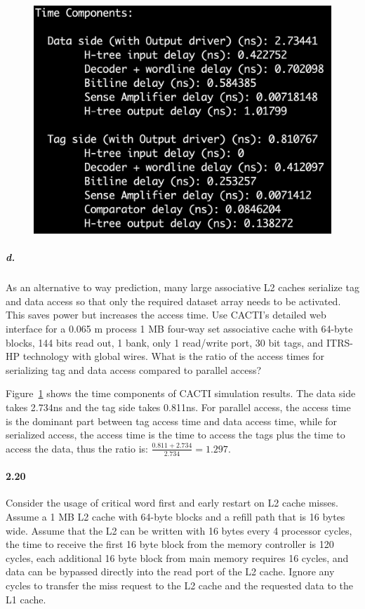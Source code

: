 \documentclass{article}
\begin{document}
\begin{figure}[!htb]
\begin{center}
\begin{minipage}{.7\linewidth}
    \centering
    \includegraphics[width=1\linewidth]{./1.png}
    \label{fig:CACTI} 
\end{minipage}
\end{center}
\end{figure}

\subparagraph{d.} As an alternative to way prediction, many large associative L2 caches serialize tag and data access so that only the required dataset array needs to be activated. This saves power but increases the access time. Use CACTI’s detailed web interface for a 0.065 m process 1 MB four-way set associative cache with 64-byte blocks, 144 bits read out, 1 bank, only 1 read/write port, 30 bit tags, and ITRS-HP technology with global wires. What is the ratio of the access times for serializing tag and data access compared to parallel access?

Figure~\ref{fig:CACTI} shows the time components of CACTI simulation results. The data side takes 2.734ns and the tag side takes 0.811ns. For parallel access, the access time is the dominant part between tag access time and data access time, while for serialized access, the access time is the time to access the tags plus the time to access the data, thus the ratio is: $\frac{0.811+2.734}{2.734}=1.297$.

\paragraph{2.20} Consider the usage of critical word first and early restart on L2 cache misses. Assume a 1 MB L2 cache with 64-byte blocks and a refill path that is 16 bytes wide. Assume that the L2 can be written with 16 bytes every 4 processor cycles, the time to receive the first 16 byte block from the memory controller is 120 cycles, each additional 16 byte block from main memory requires 16 cycles, and data can be bypassed directly into the read port of the L2 cache. Ignore any cycles to transfer the miss request to the L2 cache and the requested data to the L1 cache.
\end{document}
